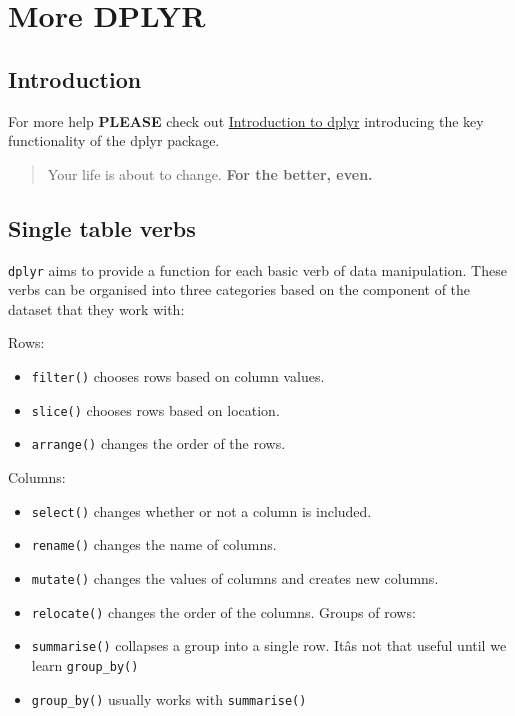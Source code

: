 \documentclass[
]{book}
\providecommand{\tightlist}{%
  \setlength{\itemsep}{0pt}\setlength{\parskip}{0pt}}
\begin{document}
\hypertarget{more-dplyr}{%
\chapter{More DPLYR}\label{more-dplyr}}

\hypertarget{introduction-3}{%
\section{Introduction}\label{introduction-3}}

For more help \textbf{PLEASE} check out \href{https://cran.r-project.org/web/packages/dplyr/vignettes/dplyr.html}{Introduction to dplyr} introducing the key functionality of the dplyr package.

\begin{quote}
Your life is about to change. \textbf{For the better, even.}
\end{quote}

\hypertarget{single-table-verbs}{%
\section{Single table verbs}\label{single-table-verbs}}

\texttt{dplyr} aims to provide a function for each basic verb of data manipulation. These verbs can be organised into three categories based on the component of the dataset that they work with:

Rows:

\begin{itemize}
\tightlist
\item
  \texttt{filter()} chooses rows based on column values.
\item
  \texttt{slice()} chooses rows based on location.
\item
  \texttt{arrange()} changes the order of the rows.
\end{itemize}

Columns:

\begin{itemize}
\tightlist
\item
  \texttt{select()} changes whether or not a column is included.
\item
  \texttt{rename()} changes the name of columns.
\item
  \texttt{mutate()} changes the values of columns and creates new columns.
\item
  \texttt{relocate()} changes the order of the columns.
  Groups of rows:
\item
  \texttt{summarise()} collapses a group into a single row. Itâs not that useful until we learn \texttt{group\_by()}
\item
  \texttt{group\_by()} usually works with \texttt{summarise()}
\end{itemize}
\end{document}
